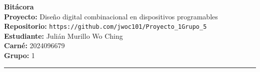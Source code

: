 \documentclass[11pt]{article}
\begin{document}
\begin{center}
    {\huge \textbf{Bitácora}}\\[0.3cm]
    {\large \textbf{Proyecto:}} Diseño digital combinacional en dispositivos programables\\[0.2cm]
    {\large \textbf{Repositorio:}} \texttt{https://github.com/jwoc101/Proyecto\_1\-Grupo\_5}\\[0.2cm]
    {\large \textbf{Estudiante:}} Julián Murillo Wo Ching\\[0.2cm]
    {\large \textbf{Carné:}} 2024096679\\[0.2cm]
    {\large \textbf{Grupo:}} 1
\end{center}

\vspace{1cm}
\hrule
\vspace{0.5cm}
\end{document}
